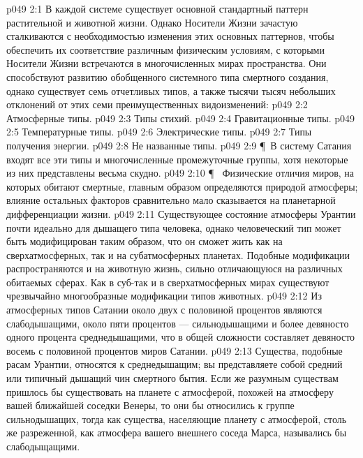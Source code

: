 \vs p049 2:1 В каждой системе существует основной стандартный паттерн растительной и животной жизни. Однако Носители Жизни зачастую сталкиваются с необходимостью изменения этих основных паттернов, чтобы обеспечить их соответствие различным физическим условиям, с которыми Носители Жизни встречаются в многочисленных мирах пространства. Они способствуют развитию обобщенного системного типа смертного создания, однако существует семь отчетливых типов, а также тысячи тысяч небольших отклонений от этих семи преимущественных видоизменений:
\vs p049 2:2 \bibnobreakspace Атмосферные типы.
\vs p049 2:3 \bibnobreakspace Типы стихий.
\vs p049 2:4 \bibnobreakspace Гравитационные типы.
\vs p049 2:5 \bibnobreakspace Температурные типы.
\vs p049 2:6 \bibnobreakspace Электрические типы.
\vs p049 2:7 \bibnobreakspace Типы получения энергии.
\vs p049 2:8 \bibnobreakspace Не названные типы.
\vs p049 2:9 \P\ В систему Сатания входят все эти типы и многочисленные промежуточные группы, хотя некоторые из них представлены весьма скудно.
\vs p049 2:10 \P\ \bibnobreakspace {} Физические отличия миров, на которых обитают смертные, главным образом определяются природой атмосферы; влияние остальных факторов сравнительно мало сказывается на планетарной дифференциации жизни.
\vs p049 2:11 Существующее состояние атмосферы Урантии почти идеально для дышащего типа человека, однако человеческий тип может быть модифицирован таким образом, что он сможет жить как на сверхатмосферных, так и на субатмосферных планетах. Подобные модификации распространяются и на животную жизнь, сильно отличающуюся на различных обитаемых сферах. Как в суб\hyp{}так и в сверхатмосферных мирах существуют чрезвычайно многообразные модификации типов животных.
\vs p049 2:12 Из атмосферных типов Сатании около двух с половиной процентов являются слабодышащими, около пяти процентов --- сильнодышащими и более девяносто одного процента среднедышащими, что в общей сложности составляет девяносто восемь с половиной процентов миров Сатании.
\vs p049 2:13 Существа, подобные расам Урантии, относятся к среднедышащим; вы представляете собой средний или типичный дышащий чин смертного бытия. Если же разумным существам пришлось бы существовать на планете с атмосферой, похожей на атмосферу вашей ближайшей соседки Венеры, то они бы относились к группе сильнодышащих, тогда как существа, населяющие планету с атмосферой, столь же разреженной, как атмосфера вашего внешнего соседа Марса, назывались бы слабодыщащими.
